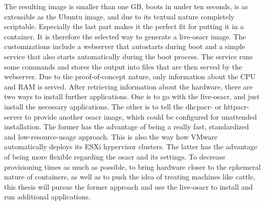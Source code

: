 The resulting image is smaller than one GB, boots in under ten seconds, is as extensible as the Ubuntu image, and due to its textual nature completely scriptable. Especially the last part makes it the perfect fit for putting it in a container. It is therefore the selected way to generate a live-\gls{osacr} image.
\newline
The customizations include a webserver that autostarts during boot and a simple service that also starts automatically during the boot process. The service runs some commands and stores the output into files that are then served by the webserver. Due to the proof-of-concept nature, only information about the CPU and RAM is served.
\newline
After retrieving information about the hardware, there are two ways to install further applications. One is to go with the live-\gls{osacr}, and just install the necessary applications. The other is to tell the \gls{dhcpacr}- or \gls{httpacr}-server to provide another \gls{osacr} image, which could be configured for unattended installation. The former has the advantage of being a really fast, standardized and low-resource-usage approach. This is also the way how VMware automatically deploys its ESXi hypervisor clusters. The latter has the advantage of being more flexible regarding the \gls{osacr} and its settings.
\newline
To decrease provisioning times as much as possible, to bring hardware closer to the ephemeral nature of containers, as well as to push the idea of treating machines like cattle, this thesis will pursue the former approach and use the live-\gls{osacr} to install and run additional applications.

